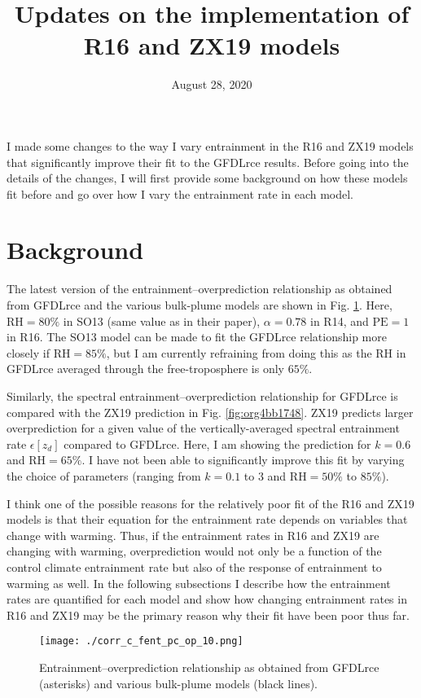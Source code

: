 \documentclass[11pt]{article}
\date{August 28, 2020}
\title{Updates on the implementation of R16 and ZX19 models}
\begin{document}
\maketitle
I made some changes to the way I vary entrainment in the R16 and ZX19 models that significantly improve their fit to the GFDLrce results. Before going into the details of the changes, I will first provide some background on how these models fit before and go over how I vary the entrainment rate in each model.

\section*{Background}
\label{sec:org0e938e6}
The latest version of the entrainment--overprediction relationship as obtained from GFDLrce and the various bulk-plume models are shown in Fig. \ref{fig:orgb97d032}. Here, \(\mathrm{RH}=80\%\) in SO13 (same value as in their paper), \(\alpha=0.78\) in R14, and \(\mathrm{PE}=1\) in R16. The SO13 model can be made to fit the GFDLrce relationship more closely if \(\mathrm{RH}=85\%\), but I am currently refraining from doing this as the RH in GFDLrce averaged through the free-troposphere is only \(65\%\).

Similarly, the spectral entrainment--overprediction relationship for GFDLrce is compared with the ZX19 prediction in Fig. \ref{fig:org4bb1748}. ZX19 predicts larger overprediction for a given value of the vertically-averaged spectral entrainment rate \(\epsilon[z_d]\) compared to GFDLrce. Here, I am showing the prediction for \(k=0.6\) and \(\mathrm{RH}=65\%\). I have not been able to significantly improve this fit by varying the choice of parameters (ranging from \(k=0.1\) to 3 and \(\mathrm{RH=50\%}\) to \(85\%\)).

I think one of the possible reasons for the relatively poor fit of the R16 and ZX19 models is that their equation for the entrainment rate depends on variables that change with warming. Thus, if the entrainment rates in R16 and ZX19 are changing with warming, overprediction would not only be a function of the control climate entrainment rate but also of the response of entrainment to warming as well. In the following subsections I describe how the entrainment rates are quantified for each model and show how changing entrainment rates in R16 and ZX19 may be the primary reason why their fit have been poor thus far.

\begin{figure}[htbp]
\centering
\texttt{[image: ./corr\_c\_fent\_pc\_op\_10.png]}
\caption{\label{fig:orgb97d032}Entrainment--overprediction relationship as obtained from GFDLrce (asterisks) and various bulk-plume models (black lines).}
\end{figure}
\end{document}
